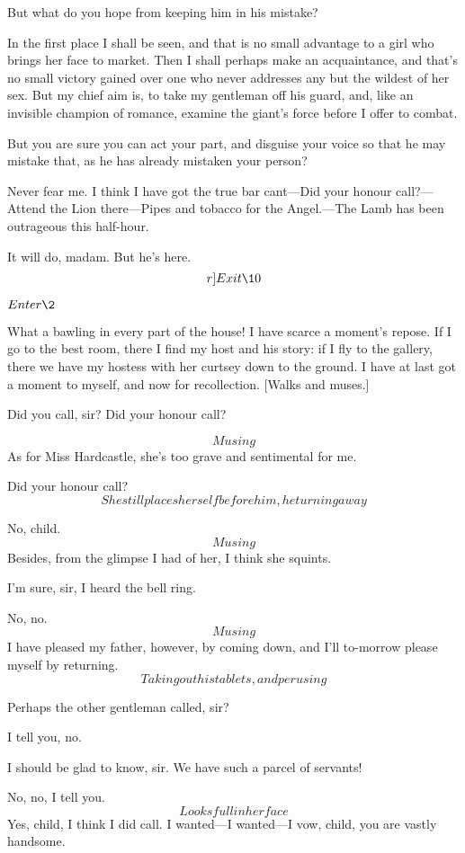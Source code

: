 \documentclass{book}
\begin{document}
  But what do you hope from keeping him in his mistake?

\8  In the first place I shall be seen, and that is no
small advantage to a girl who brings her face to market.  Then I shall
perhaps make an acquaintance, and that's no small victory gained over
one who never addresses any but the wildest of her sex.  But my chief
aim is, to take my gentleman off his guard, and, like an invisible
champion of romance, examine the giant's force before I offer to
combat.

  But you are sure you can act your part, and disguise your voice
so that he may mistake that, as he has already mistaken your person?

\8  Never fear me.  I think I have got the true bar
cant---Did your honour call?---Attend the Lion there---Pipes and tobacco
for the Angel.---The Lamb has been outrageous this half-hour.

  It will do, madam.  But he's here.  \[r]Exit \10\]


\(Enter \2\)


\2  What a bawling in every part of the house!  I have scarce a
moment's repose.  If I go to the best room, there I find my host and
his story: if I fly to the gallery, there we have my hostess with her
curtsey down to the ground.  I have at last got a moment to myself, and
now for recollection.  [Walks and muses.]

\8  Did you call, sir?  Did your honour call?

\2  \[Musing\]  As for Miss Hardcastle, she's too grave and
sentimental for me.

\8  Did your honour call?  \[She still places herself
before him, he turning away\]

\2  No, child.  \[Musing\]  Besides, from the glimpse I had of her,
I think she squints.

\8  I'm sure, sir, I heard the bell ring.

\2  No, no.  \[Musing\]  I have pleased my father, however, by
coming down, and I'll to-morrow please myself by returning. \[Taking
out his tablets, and perusing\]

\8  Perhaps the other gentleman called, sir?

\2  I tell you, no.

\8  I should be glad to know, sir.  We have such a
parcel of servants!

\2  No, no, I tell you.  \[Looks full in her face\]  Yes, child, I
think I did call.  I wanted---I wanted---I vow, child, you are vastly
handsome.
\end{document}
